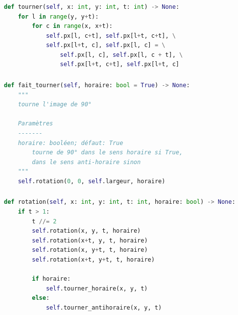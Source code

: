 \documentclass[svgnames,11pt]{beamer}
\begin{document}
\begin{frame}[fragile]
    \frametitle{}

\begin{center}
\begin{lstlisting}[language=Python , basicstyle=\ttfamily\small, xleftmargin=.5em, xrightmargin=.5em]
def tourner(self, x: int, y: int, t: int) -> None:
    for l in range(y, y+t):
        for c in range(x, x+t):
            self.px[l, c+t], self.px[l+t, c+t], \
            self.px[l+t, c], self.px[l, c] = \
                self.px[l, c], self.px[l, c + t], \
                self.px[l+t, c+t], self.px[l+t, c]
\end{lstlisting}
\end{center}

\end{frame}
\begin{frame}[fragile]
    \frametitle{}

\begin{center}
\begin{lstlisting}[language=Python , basicstyle=\ttfamily\small, xleftmargin=2em, xrightmargin=2em]
def fait_tourner(self, horaire: bool = True) -> None:
    """
    tourne l'image de 90°

    Paramètres
    -------
    horaire: booléen; défaut: True
        tourne de 90° dans le sens horaire si True,
        dans le sens anti-horaire sinon
    """
    self.rotation(0, 0, self.largeur, horaire)
\end{lstlisting}
\label{CODE}
\end{center}

\end{frame}
\begin{frame}[fragile]
    \frametitle{}
\begin{center}
\begin{lstlisting}[language=Python , basicstyle=\ttfamily\small, xleftmargin=2em, xrightmargin=2em]
def rotation(self, x: int, y: int, t: int, horaire: bool) -> None:
    if t > 1:
        t //= 2
        self.rotation(x, y, t, horaire)
        self.rotation(x+t, y, t, horaire)
        self.rotation(x, y+t, t, horaire)
        self.rotation(x+t, y+t, t, horaire)

        if horaire:
            self.tourner_horaire(x, y, t)
        else:
            self.tourner_antihoraire(x, y, t)
\end{lstlisting}
\label{CODE}
\end{center}
    

\end{frame}
\end{document}
